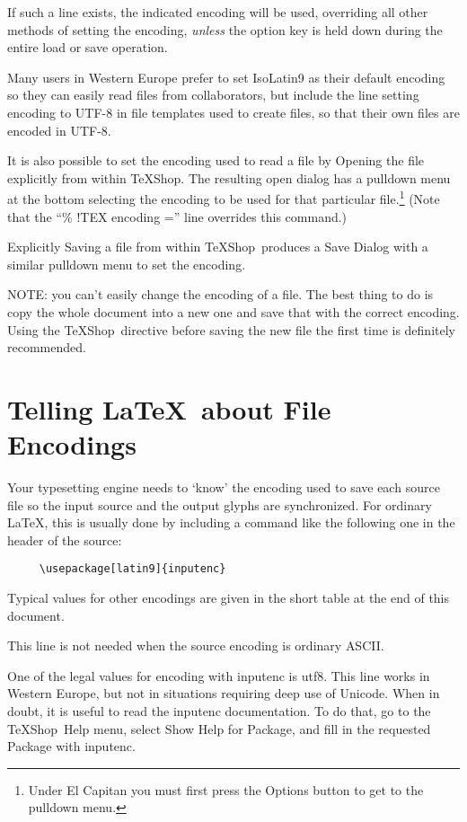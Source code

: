\documentclass[letterpaper,11pt]{article}
\newcommand{\TS}{\textsf{\TeX Shop}}
\newcommand{\acr}[1]{\textsf{#1}}
\newcommand{\cmd}[1]{\textsf{#1}}
\newcommand{\mnu}[1]{\textsf{#1}}
\begin{document}
If such a line exists, the indicated encoding will be used, overriding all other methods
of setting the encoding, \emph{unless} the option key is held down during the entire
load or save operation. 

Many users in Western Europe prefer to set \acr{IsoLatin9} as their default encoding so they
can easily read files from collaborators, but include the line setting encoding to \acr{UTF-8}
in file templates used to create files, so that their own files are encoded in \acr{UTF-8}.

It is also possible to set the encoding used to read a file by Opening the file explicitly from within \TS. The resulting open dialog has a pulldown menu at the bottom selecting
the encoding to be used for that particular file.\footnote{Under \cmd{El Capitan} you must first press the \cmd{Options} button to get to the pulldown menu.} (Note that the ``\acr{\% !TEX encoding =}''
line overrides this command.)

Explicitly Saving a file from within \TS\ produces a Save Dialog with a similar pulldown menu to set the encoding.

NOTE: you can't easily change the encoding of a file. The best thing to do is copy the whole document into a new one and save that with the correct encoding. Using the \TS\ directive before saving the new file the first time is definitely recommended.

\section{Telling \LaTeX\ about File Encodings}

Your typesetting engine needs to `know' the encoding used to save each source file so the input source and the output glyphs are synchronized. For ordinary \LaTeX, this is usually
done by including a command like the following one in the header of the source:
\begin{verbatim}
     \usepackage[latin9]{inputenc}	
\end{verbatim}
Typical values for other encodings are given in the short table at the end of this
document.

This line is not needed when the source encoding is ordinary \acr{ASCII}. 

One of the legal values
for encoding with inputenc is \cmd{utf8}. This line works in Western Europe, but not in situations
requiring deep use of \cmd{Unicode}. When in doubt, it is useful to read the \cmd{inputenc} documentation. To do that, go to the \TS\ \mnu{Help} menu, select \cmd{Show Help for Package}, and
fill in the requested Package with \cmd{inputenc}.
\end{document}
